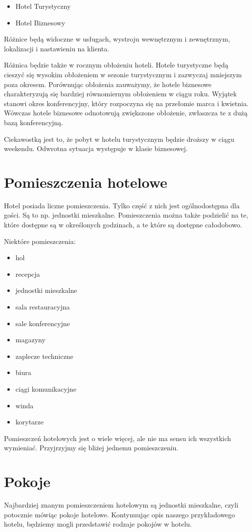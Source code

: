 \documentclass[a4paper,onecolumn,oneside,11pt,wide,floatssmall]{mwrep}
\theoremstyle{definition}
\theoremstyle{plain}%
\theoremstyle{remark}
\begin{document}
\begin{itemize}
  \item Hotel Turystyczny
  \item Hotel Biznesowy
\end{itemize}

Różnice będą widoczne w usługach, wystroju wewnętrznym i zewnętrznym, 
lokalizacji i nastawieniu na klienta.

Różnica będzie także w rocznym obłożeniu hoteli. Hotele turystyczne będą 
cieszyć się wysokim obłożeniem w sezonie turystycznym i zazwyczaj 
mniejszym poza okresem. Porównując obłożenia zauważymy, że hotele biznesowe 
charakteryzują się bardziej równomiernym obłożeniem w ciągu roku. 
Wyjątek stanowi okres konferencyjny, który rozpoczyna się na przełomie 
marca i kwietnia. Wówczas hotele biznesowe odnotowują zwiększone obłożenie,
 zwłaszcza te z dużą bazą konferencyjną.

Ciekawostką jest to, że pobyt w hotelu turystycznym będzie droższy w ciągu 
weekendu. Odwrotna sytuacja występuje w klasie biznesowej.

\section{Pomieszczenia hotelowe}
Hotel posiada liczne pomieszczenia. Tylko część z nich jest ogólnodostępna 
dla gości. Są to np. jednostki mieszkalne. Pomieszczenia można także 
podzielić na te, które dostępne są w określonych godzinach, a te które są 
dostępne całodobowo.

Niektóre pomieszczenia:
\begin{itemize}
\item hol
\item recepcja
\item jednostki mieszkalne
\item sala restauracyjna
\item sale konferencyjne
\item magazyny
\item zaplecze techniczne
\item biura
\item ciągi komunikacyjne
\item winda
\item korytarze
\end{itemize}

Pomieszczeń hotelowych jest o wiele więcej, ale nie ma sensu ich wszystkich 
wymieniać. Przyjrzyjmy się bliżej jednemu pomieszczeniu.

\section{Pokoje}
Najbardziej znanym pomieszczeniem hotelowym są jednostki mieszkalne, czyli 
potocznie mówiąc pokoje hotelowe. Kontynuując opis naszego przykładowego 
hotelu, będziemy mogli przedstawić rodzaje pokojów w hotelu.
\end{document}
